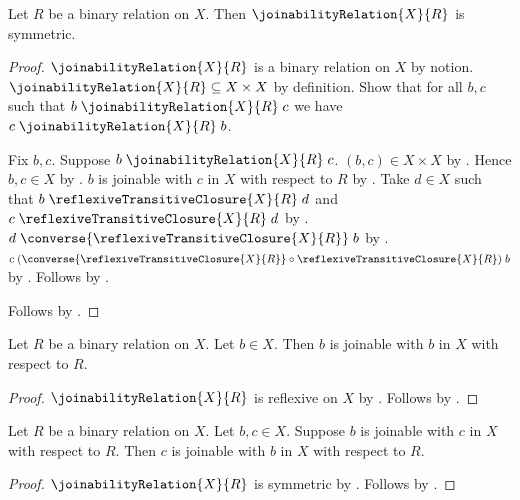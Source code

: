 \begin{proposition}\label{joinability_relation_is_symmetric}
    Let $R$ be a binary relation on $X$.
    Then $\joinabilityRelation{X}{R}$ is symmetric.
\end{proposition}
\begin{proof}
    $\joinabilityRelation{X}{R}$ is a binary relation on $X$ by notion.
    $\joinabilityRelation{X}{R}\subseteq X\times X$ by definition.
    Show that for all $b,c$ such that
        $b\mathrel{\joinabilityRelation{X}{R}}c$ we have
        $c\mathrel{\joinabilityRelation{X}{R}}b$.
    \begin{subproof}
        Fix $b,c$.
        Suppose $b\mathrel{\joinabilityRelation{X}{R}}c$.
        $(b,c)\in X\times X$ by .
        Hence $b,c\in X$ by .
        $b$ is joinable with $c$ in $X$ with respect to $R$
            by .
        Take $d\in X$ such that
            $b\mathrel{\reflexiveTransitiveClosure{X}{R}}d$ and
            $c\mathrel{\reflexiveTransitiveClosure{X}{R}}d$
            by .
        $d\mathrel{\converse{\reflexiveTransitiveClosure{X}{R}}}b$
            by .
        $c\mathrel{(\converse{\reflexiveTransitiveClosure{X}{R}}\circ
            \reflexiveTransitiveClosure{X}{R})}b$ by .
        Follows by .
    \end{subproof}
    Follows by .
\end{proof}

\begin{corollary}\label{joinable_reflexive}
    Let $R$ be a binary relation on $X$.
    Let $b\in X$.
    Then $b$ is joinable with $b$ in $X$ with respect to $R$.
\end{corollary}
\begin{proof}
    $\joinabilityRelation{X}{R}$ is reflexive on $X$
        by .
    Follows by .
\end{proof}

\begin{corollary}\label{joinable_symmetric}
    Let $R$ be a binary relation on $X$.
    Let $b,c\in X$.
    Suppose $b$ is joinable with $c$ in $X$ with respect to $R$.
    Then $c$ is joinable with $b$ in $X$ with respect to $R$.
\end{corollary}
\begin{proof}
    $\joinabilityRelation{X}{R}$ is symmetric
        by .
    Follows by .
\end{proof}

